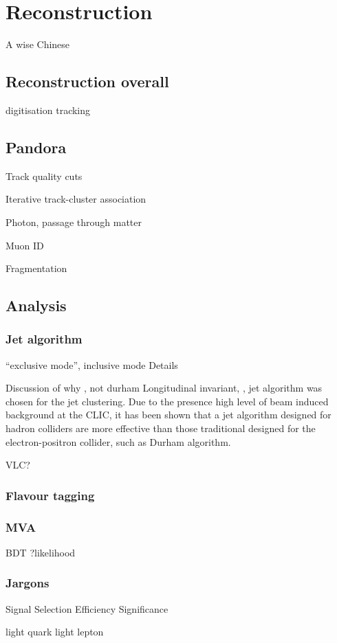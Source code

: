 \chapter{Reconstruction}
\label{chap:Reconstruction}

%
{A wise Chinese}%


\section{Reconstruction overall}
digitisation
tracking

\section{Pandora}

Track quality cuts

Iterative track-cluster association

Photon, passage through matter

Muon ID

Fragmentation

\section{Analysis}

\subsection{Jet algorithm}

``exclusive mode'', inclusive mode
Details

Discussion of why \kt, not durham
Longitudinal invariant, \kt, jet algorithm was chosen for the jet clustering. Due to the presence high level of beam induced background at the CLIC, it has been shown that a jet algorithm designed for hadron colliders are more effective than those traditional designed for the electron-positron collider, such as Durham algorithm.\cite{}

VLC?

\subsection{Flavour tagging}

\subsection{MVA}

BDT
?likelihood

\subsection{Jargons}
Signal
Selection
Efficiency
Significance

\qlight light quark
light lepton
